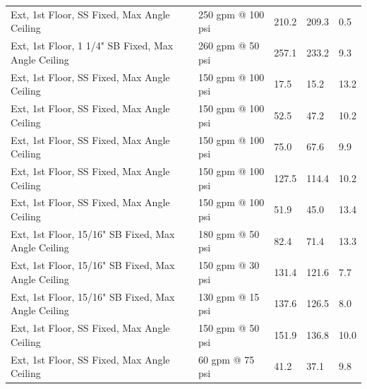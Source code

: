 \documentclass[12pt,oneside]{book}
\begin{document}
\begin{table}[!ht]
\begin{tabular}{lllll}
Ext, 1st Floor, SS Fixed, Max Angle Ceiling           & 250 gpm @ 100 psi              & 210.2                             & 209.3                              & 0.5                    \\
Ext, 1st Floor, 1 1/4" SB Fixed, Max Angle Ceiling    & 260 gpm @ 50 psi               & 257.1                             & 233.2                              & 9.3                    \\
Ext, 1st Floor, SS Fixed, Max Angle Ceiling           & 150 gpm @ 100 psi              & 17.5                              & 15.2                               & 13.2                   \\
Ext, 1st Floor, SS Fixed, Max Angle Ceiling           & 150 gpm @ 100 psi              & 52.5                              & 47.2                               & 10.2                   \\
Ext, 1st Floor, SS Fixed, Max Angle Ceiling           & 150 gpm @ 100 psi              & 75.0                              & 67.6                               & 9.9                    \\
Ext, 1st Floor, SS Fixed, Max Angle Ceiling           & 150 gpm @ 100 psi              & 127.5                             & 114.4                              & 10.2                   \\
Ext, 1st Floor, SS Fixed, Max Angle Ceiling           & 150 gpm @ 100 psi              & 51.9                              & 45.0                               & 13.4                   \\
Ext, 1st Floor, 15/16" SB Fixed, Max Angle Ceiling    & 180 gpm @ 50 psi               & 82.4                              & 71.4                               & 13.3                   \\
Ext, 1st Floor, 15/16" SB Fixed, Max Angle Ceiling    & 150 gpm @ 30 psi               & 131.4                             & 121.6                              & 7.7                    \\
Ext, 1st Floor, 15/16" SB Fixed, Max Angle Ceiling    & 130 gpm @ 15 psi               & 137.6                             & 126.5                              & 8.0                    \\
Ext, 1st Floor, SS Fixed, Max Angle Ceiling           & 150 gpm @ 50 psi               & 151.9                             & 136.8                              & 10.0                   \\
Ext, 1st Floor, SS Fixed, Max Angle Ceiling           & 60 gpm @ 75 psi                &  41.2                             & 37.1                               & 9.8                    \\

\end{tabular}
\end{table}
\end{document}
